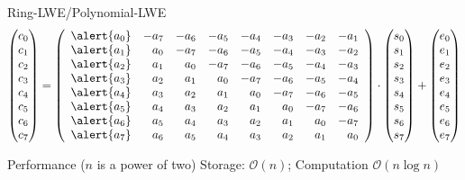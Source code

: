 \documentclass[xcolor=table,10pt,aspectratio=169]{beamer}
\begin{document}
\begin{frame}[label={sec:org3eb8468}]{Ring-LWE/Polynomial-LWE}
\[
\begin{pmatrix}c_{0} \\ c_{1} \\ c_{2} \\ c_{3} \\ c_{4} \\ c_{5} \\ c_{6} \\ c_{7}\end{pmatrix} = 
\left(\begin{array}{rrrrrrrr}
\alert{a_{0}} & -a_{7} & -a_{6} & -a_{5} & -a_{4} & -a_{3} & -a_{2} & -a_{1} \\
\alert{a_{1}} & a_{0} & -a_{7} & -a_{6} & -a_{5} & -a_{4} & -a_{3} & -a_{2} \\
\alert{a_{2}} & a_{1} & a_{0} & -a_{7} & -a_{6} & -a_{5} & -a_{4} & -a_{3} \\
\alert{a_{3}} & a_{2} & a_{1} & a_{0} & -a_{7} & -a_{6} & -a_{5} & -a_{4} \\
\alert{a_{4}} & a_{3} & a_{2} & a_{1} & a_{0} & -a_{7} & -a_{6} & -a_{5} \\
\alert{a_{5}} & a_{4} & a_{3} & a_{2} & a_{1} & a_{0} & -a_{7} & -a_{6} \\
\alert{a_{6}} & a_{5} & a_{4} & a_{3} & a_{2} & a_{1} & a_{0} & -a_{7} \\
\alert{a_{7}} & a_{6} & a_{5} & a_{4} & a_{3} & a_{2} & a_{1} & a_{0}
\end{array}\right)\cdot
\begin{pmatrix}s_{0} \\ s_{1} \\ s_{2} \\ s_{3} \\ s_{4} \\ s_{5} \\ s_{6} \\ s_{7}\end{pmatrix} +
\begin{pmatrix}e_{0} \\ e_{1} \\ e_{2} \\ e_{3} \\ e_{4} \\ e_{5} \\ e_{6} \\ e_{7}\end{pmatrix}
\]
\begin{block}{Performance (\(n\) is a power of two)}
Storage: \(\mathcal{O}(n)\); Computation \(\mathcal{O}(n \log n)\)
\end{block}
\end{frame}
\end{document}
